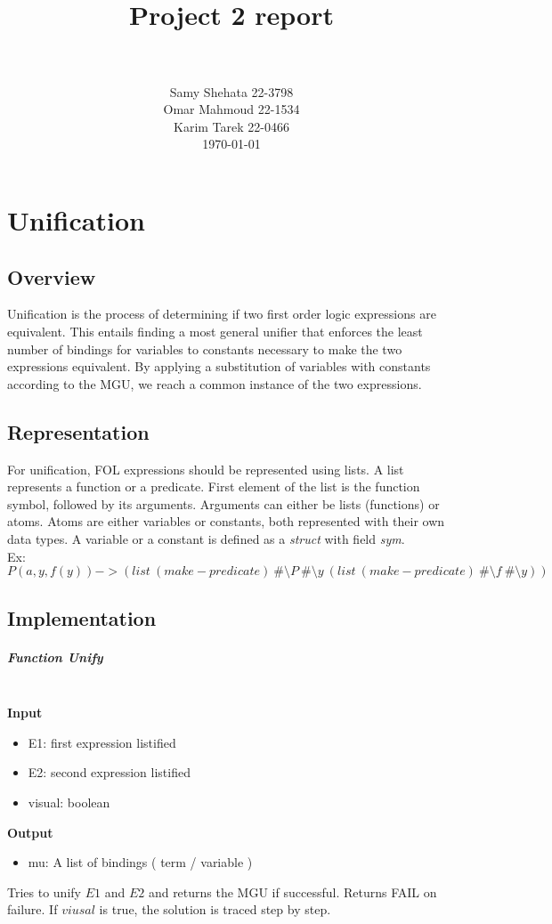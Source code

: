 \documentclass[paper=a4, fontsize=11pt]{scrartcl}
\title{
		\usefont{OT1}{bch}{b}{n}
		\normalfont \normalsize \textsc{} \\ [25pt]
		\horrule{0.5pt} \\[0.4cm]
		\huge Project 2 report \\
		\horrule{2pt} \\[0.5cm]
}
\author{
		\normalfont 								\normalsize
        Samy Shehata 22-3798\\[-3pt]		\normalsize
        Omar Mahmoud 22-1534\\[-3pt]		\normalsize
        Karim Tarek 22-0466\\[-3pt]		\normalsize
        \today
}
\date{}
\numberwithin{equation}{section}		%
\numberwithin{figure}{section}			%
\numberwithin{table}{section}				%
\begin{document}
\maketitle
\section{Unification}
\subsection{Overview}
Unification is the process of determining if two first order logic expressions
are equivalent. This entails finding a most general unifier that enforces the
least number of bindings for variables to constants necessary to make the two
expressions equivalent. By applying a substitution of variables with constants
according to the MGU, we reach a common instance of the two expressions.

\subsection{Representation}
For unification, FOL expressions should be represented using lists. A list
represents a function or a predicate. First element of the list is the function
symbol, followed by its arguments. Arguments can either be lists (functions) or
atoms. Atoms are either variables or constants, both represented with their own
data types. A variable or a constant is defined as a \textit{struct} with field
\textit{sym}. \\
Ex:
\[
  P(a, y, f(y)) ->
  (list\ (make-predicate)\ \#\setminus P\ \#\setminus y\ (list\
  (make-predicate)\ \#\setminus f\
  \#\setminus y))
\]

\subsection{Implementation}

\subparagraph{Function Unify} \mbox{} \\
\noindent\textbf{Input}
\begin{itemize}
  \item {E1:} first expression listified
  \item {E2:} second expression listified
  \item {visual:} boolean
\end{itemize}
\noindent\textbf{Output}
\begin{itemize}
    \item{mu:} A list of bindings ( term / variable )
\end{itemize}
Tries to unify $E1$ and  $E2$ and returns the MGU if successful. Returns FAIL on
failure. If $viusal$ is true, the solution is traced step by step.
\end{document}
